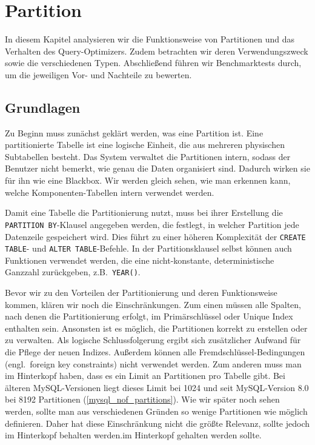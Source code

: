 
\chapter{Partition}\label{ch:partition}
In diesem Kapitel analysieren wir die Funktionsweise von Partitionen und das Verhalten des Query-Optimizers.
Zudem betrachten wir deren Verwendungszweck sowie die verschiedenen Typen.
Abschließend führen wir Benchmarktests durch, um die jeweiligen Vor- und Nachteile zu bewerten.

\section{Grundlagen}\label{sec:partition-grundlagen}
Zu Beginn muss zunächst geklärt werden, was eine Partition ist.
Eine partitionierte Tabelle ist eine logische Einheit, die aus mehreren physischen Subtabellen besteht.
Das System verwaltet die Partitionen intern, sodass der Benutzer nicht bemerkt, wie genau die Daten organisiert sind.
Dadurch wirken sie für ihn wie eine Blackbox.
Wir werden gleich sehen, wie man erkennen kann, welche Komponenten-Tabellen intern verwendet werden.

Damit eine Tabelle die Partitionierung nutzt, muss bei ihrer Erstellung die \texttt{PARTITION BY}-Klausel angegeben werden, die festlegt, in welcher Partition jede Datenzeile gespeichert wird.
Dies führt zu einer höheren Komplexität der \texttt{CREATE TABLE}- und \texttt{ALTER TABLE}-Befehle.
In der Partitionsklausel selbst können auch Funktionen verwendet werden, die eine nicht-konstante, deterministische Ganzzahl zurückgeben, z.B.\ \texttt{YEAR()}.

Bevor wir zu den Vorteilen der Partitionierung und deren Funktionsweise kommen, klären wir noch die Einschränkungen.
Zum einen müssen alle Spalten, nach denen die Partitionierung erfolgt, im Primärschlüssel oder Unique Index enthalten sein.
Ansonsten ist es möglich, die Partitionen korrekt zu erstellen oder zu verwalten.
Als logische Schlussfolgerung ergibt sich zusätzlicher Aufwand für die Pflege der neuen Indizes.
Außerdem können alle Fremdschlüssel-Bedingungen (engl.\ foreign key constraints) nicht verwendet werden.
Zum anderen muss man im Hinterkopf haben, dass es ein Limit an Partitionen pro Tabelle gibt.
Bei älteren MySQL-Versionen liegt dieses Limit bei 1024 und seit MySQL-Version 8.0 bei 8192 Partitionen (\ref{mysql_nof_partitions}).
Wie wir später noch sehen werden, sollte man aus verschiedenen Gründen so wenige Partitionen wie möglich definieren.
Daher hat diese Einschränkung nicht die größte Relevanz, sollte jedoch im Hinterkopf behalten werden.im Hinterkopf gehalten werden sollte.

